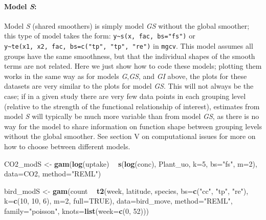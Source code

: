 \documentclass[12pt]{article}
\newenvironment{Shaded}{\begin{snugshade}}{\end{snugshade}}
\newcommand{\KeywordTok}[1]{\textcolor[rgb]{0.13,0.29,0.53}{\textbf{#1}}}
\newcommand{\DataTypeTok}[1]{\textcolor[rgb]{0.13,0.29,0.53}{#1}}
\newcommand{\DecValTok}[1]{\textcolor[rgb]{0.00,0.00,0.81}{#1}}
\newcommand{\StringTok}[1]{\textcolor[rgb]{0.31,0.60,0.02}{#1}}
\newcommand{\OtherTok}[1]{\textcolor[rgb]{0.56,0.35,0.01}{#1}}
\newcommand{\OperatorTok}[1]{\textcolor[rgb]{0.81,0.36,0.00}{\textbf{#1}}}
\newcommand{\NormalTok}[1]{#1}
\let\oldparagraph\paragraph
\renewcommand{\paragraph}[1]{\oldparagraph{#1}\mbox{}}
\begin{document}
\paragraph{\texorpdfstring{Model \emph{S}:}{Model S:}}\label{model-s}

Model \emph{S} (shared smoothers) is simply model \emph{GS} without the
global smoother; this type of model takes the form:
\texttt{y\textasciitilde{}s(x,\ fac,\ bs="fs")} or
\texttt{y\textasciitilde{}te(x1,\ x2,\ fac,\ bs=c("tp",\ "tp",\ "re")}
in \texttt{mgcv}. This model assumes all groups have the same
smoothness, but that the individual shapes of the smooth terms are not
related. Here we just show how to code these models; plotting them works
in the same way as for models \emph{G},\emph{GS}, and \emph{GI} above,
the plots for these datasets are very similar to the plots for model
\emph{GS}. This will not always be the case; if in a given study there
are very few data points in each grouping level (relative to the
strength of the functional relationship of interest), estimates from
model \emph{S} will typically be much more variable than from model
\emph{GS}, as there is no way for the model to share information on
function shape between grouping levels without the global smoother. See
section V on computational issues for more on how to choose between
different models.

\begin{Shaded}
\begin{Highlighting}[]
\NormalTok{CO2_modS <-}\StringTok{ }\KeywordTok{gam}\NormalTok{(}\KeywordTok{log}\NormalTok{(uptake) }\OperatorTok{~}\StringTok{ }\KeywordTok{s}\NormalTok{(}\KeywordTok{log}\NormalTok{(conc), Plant_uo, }\DataTypeTok{k=}\DecValTok{5}\NormalTok{, }\DataTypeTok{bs=}\StringTok{"fs"}\NormalTok{, }\DataTypeTok{m=}\DecValTok{2}\NormalTok{),}
                \DataTypeTok{data=}\NormalTok{CO2, }\DataTypeTok{method=}\StringTok{"REML"}\NormalTok{)}

\NormalTok{bird_modS <-}\StringTok{ }\KeywordTok{gam}\NormalTok{(count }\OperatorTok{~}\StringTok{ }\KeywordTok{t2}\NormalTok{(week, latitude, species, }\DataTypeTok{bs=}\KeywordTok{c}\NormalTok{(}\StringTok{"cc"}\NormalTok{, }\StringTok{"tp"}\NormalTok{, }\StringTok{"re"}\NormalTok{),}
                            \DataTypeTok{k=}\KeywordTok{c}\NormalTok{(}\DecValTok{10}\NormalTok{, }\DecValTok{10}\NormalTok{, }\DecValTok{6}\NormalTok{), }\DataTypeTok{m=}\DecValTok{2}\NormalTok{, }\DataTypeTok{full=}\OtherTok{TRUE}\NormalTok{),}
                 \DataTypeTok{data=}\NormalTok{bird_move, }\DataTypeTok{method=}\StringTok{"REML"}\NormalTok{, }\DataTypeTok{family=}\StringTok{"poisson"}\NormalTok{,}
                 \DataTypeTok{knots=}\KeywordTok{list}\NormalTok{(}\DataTypeTok{week=}\KeywordTok{c}\NormalTok{(}\DecValTok{0}\NormalTok{, }\DecValTok{52}\NormalTok{)))}
\end{Highlighting}
\end{Shaded}
\end{document}
